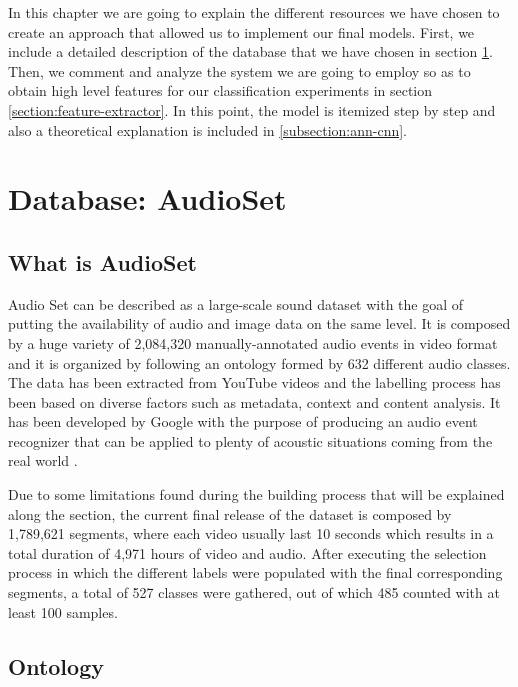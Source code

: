 
	In this chapter we are going to explain the different resources we have chosen to create an approach that allowed us to implement our final models. First, we include a detailed description of the database that we have chosen in section \ref{section:audioset}. Then, we comment and analyze the system we are going to employ so as to obtain high level features for our classification experiments in section \ref{section:feature-extractor}. In this point, the model is itemized step by step and also a theoretical explanation is included in \ref{subsection:ann-cnn}.
	
\section{Database: AudioSet}
\label{section:audioset}

\subsection{What is AudioSet} 
\label{subsection:what-is-audioset}

	Audio Set can be described as a large-scale sound dataset with the goal of putting the availability of audio and image data on the same level. It is composed by a huge variety of 2,084,320 manually-annotated audio events in video format and it is organized by following an ontology formed by 632 different audio classes. The data has been extracted from YouTube videos and the labelling process has been based on diverse factors such as metadata, context and content analysis. It has been developed by Google with the purpose of producing an audio event recognizer that can be applied to plenty of acoustic situations coming from the real world \cite{Gemmeke2017}.
	
	Due to some limitations found during the building process that will be explained along the section, the current final release of the dataset is composed by 1,789,621 segments, where each video usually last 10 seconds which results in a total duration of 4,971 hours of video and audio. After executing the selection process in which the different labels were populated with the final corresponding segments, a total of 527 classes were gathered, out of which 485 counted with at least 100 samples.

\subsection{Ontology}
\label{subsecition:ontology}


